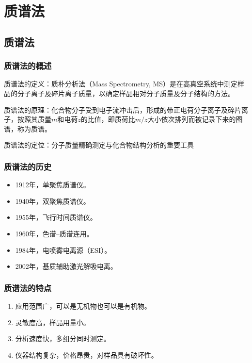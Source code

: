 \chapter{质谱法}

\section{质谱法}

\subsection{质谱法的概述}

质谱法的定义：质朴分析法（Mass Spectrometry, MS）是在高真空系统中测定样品的分子离子及碎片离子质量，以确定样品相对分子质量及分子结构的方法。

质谱法的原理：化合物分子受到电子流冲击后，形成的带正电荷分子离子及碎片离子，按照其质量$m$和电荷$z$的比值，即质荷比$m/z$大小依次排列而被记录下来的图谱，称为质谱。

质谱法的定位：分子质量精确测定与化合物结构分析的重要工具

\subsection{质谱法的历史}
\begin{itemize}
    \item 1912年，单聚焦质谱仪。
    \item 1940年，双聚焦质谱仪。
    \item 1955年，飞行时间质谱仪。
    \item 1960年，色谱--质谱连用。
    \item 1984年，电喷雾电离源（ESI）。
    \item 2002年，基质辅助激光解吸电离。
\end{itemize}

\subsection{质谱法的特点}
\begin{enumerate}
    \item 应用范围广，可以是无机物也可以是有机物。
    \item 灵敏度高，样品用量小。
    \item 分析速度快，多组分同时测定。
    \item 仪器结构复杂，价格昂贵，对样品具有破坏性。
\end{enumerate}

